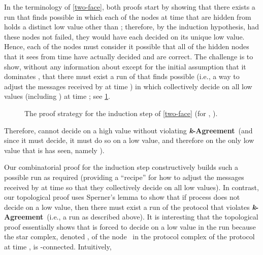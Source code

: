 \documentclass[11pt]{article}
\theoremstyle{definition}
\newcommand{\defemph}[1]{\textbf{\textit{#1}}}
\newcommand{\kAgreement}{{\bf \defemph{k}-Agreement}}
\begin{document}
In the terminology of \cref{two-face},
both proofs start by showing that there exists a run that  finds possible in which each of the  nodes at
time  that are hidden from  holds a distinct low value other than ; therefore, by the induction hypothesis, had these  nodes not failed, they would have each  decided  on its unique low value. Hence, each of the nodes  must consider it possible that all of the hidden nodes that it sees from time  have actually decided and are correct. The challenge is to show, without any information about  except for the initial assumption that it dominates , that there must exist a run  of  that  finds possible (i.e., a way to adjust the messages received by  at time ) in which  collectively decide on all low values (including ) at time ; see \cref{fig-two-face}.\begin{figure}[t]
    \centering
        \quad
        \quad
        \quad
        \vspace{-0.3cm}
        \caption{
            The proof strategy for the induction step of \cref{two-face} (for , ).
        }
	\label{fig-two-face}
\end{figure}
 Therefore,  cannot decide on a high value without violating \kAgreement\ (and since it must decide, it must do so on a low value, and therefore on the only low value that is has seen, namely ).

Our combinatorial proof for the induction step constructively builds such a possible run  as required (providing a ``recipe'' for how to adjust the messages received by  at time  so that they collectively decide on all low values).
In contrast, our topological proof uses Sperner's
lemma to show that if process  does not decide on a low value, then there must exist a run of the protocol that violates \kAgreement\
(i.e., a run  as described above).
It is interesting that the topological proof essentially shows that
 is forced to decide on a low value in the run  because the star complex, denoted ,
of the node~ in the protocol complex  of the protocol~ at time , is -connected.
Intuitively,
\end{document}
